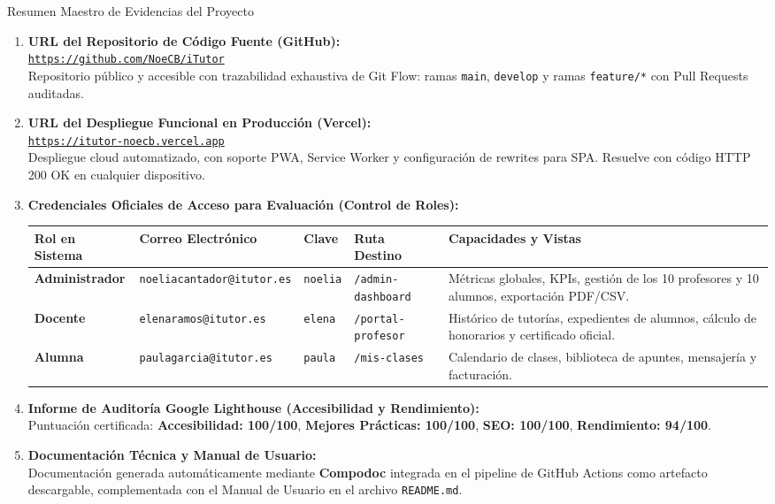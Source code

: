 \documentclass[11pt,a4paper]{article}
\begin{document}
\begin{kpiBox}{Resumen Maestro de Evidencias del Proyecto}
\begin{enumerate}[label=\textbf{\arabic*.}]
    \item \textbf{URL del Repositorio de Código Fuente (GitHub):} \\
          \href{https://github.com/NoeCB/iTutor}{\texttt{https://github.com/NoeCB/iTutor}} \\
          \small\color{textMuted}Repositorio público y accesible con trazabilidad exhaustiva de Git Flow: ramas \texttt{main}, \texttt{develop} y ramas \texttt{feature/*} con Pull Requests auditadas.
    \item \textbf{URL del Despliegue Funcional en Producción (Vercel):} \\
          \href{https://itutor-noecb.vercel.app}{\texttt{https://itutor-noecb.vercel.app}} \\
          \small\color{textMuted}Despliegue cloud automatizado, con soporte PWA, Service Worker y configuración de rewrites para SPA. Resuelve con código HTTP 200 OK en cualquier dispositivo.
    \item \textbf{Credenciales Oficiales de Acceso para Evaluación (Control de Roles):}
          \begin{center}
          \footnotesize
          \begin{tabularx}{\textwidth}{l l l l X}
          \toprule
          \textbf{Rol en Sistema} & \textbf{Correo Electrónico} & \textbf{Clave} & \textbf{Ruta Destino} & \textbf{Capacidades y Vistas} \\
          \midrule
          \textbf{Administrador} & \texttt{noeliacantador@itutor.es} & \texttt{noelia} & \texttt{/admin-dashboard} & Métricas globales, KPIs, gestión de los 10 profesores y 10 alumnos, exportación PDF/CSV. \\
          \textbf{Docente}     & \texttt{elenaramos@itutor.es}    & \texttt{elena}  & \texttt{/portal-profesor}  & Histórico de tutorías, expedientes de alumnos, cálculo de honorarios y certificado oficial. \\
          \textbf{Alumna}     & \texttt{paulagarcia@itutor.es}    & \texttt{paula}  & \texttt{/mis-clases}       & Calendario de clases, biblioteca de apuntes, mensajería y facturación. \\
          \bottomrule
          \end{tabularx}
          \end{center}
    \item \textbf{Informe de Auditoría Google Lighthouse (Accesibilidad y Rendimiento):} \\
          Puntuación certificada: \textbf{Accesibilidad: 100/100}, \textbf{Mejores Prácticas: 100/100}, \textbf{SEO: 100/100}, \textbf{Rendimiento: 94/100}.
    \item \textbf{Documentación Técnica y Manual de Usuario:} \\
          Documentación generada automáticamente mediante \textbf{Compodoc} integrada en el pipeline de GitHub Actions como artefacto descargable, complementada con el Manual de Usuario en el archivo \texttt{README.md}.
\end{enumerate}
\end{kpiBox}
\end{document}
